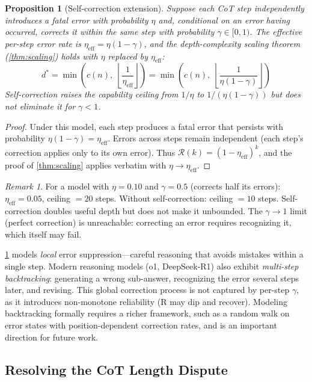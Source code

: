 \documentclass{article}
\newtheorem{proposition}[theorem]{Proposition}
\theoremstyle{definition}
\theoremstyle{remark}
\newtheorem{remark}[theorem]{Remark}
\newcommand{\depth}{d^*}       %
\newcommand{\noise}{\eta}      %
\newcommand{\neff}{\noise_{\mathrm{eff}}} %
\newcommand{\rel}{\mathcal{R}} %
\newcommand{\ccot}{c}          %
\begin{document}
\begin{proposition}[Self-correction extension]
\label{prop:self-correction}
Suppose each CoT step independently introduces a fatal error with probability $\noise$ and, conditional on an error having occurred, corrects it within the same step with probability $\gamma \in [0, 1)$. The effective per-step error rate is $\neff = \noise(1 - \gamma)$, and the depth-complexity scaling theorem (\cref{thm:scaling}) holds with $\noise$ replaced by $\neff$:
\[
\depth = \min\!\left(\ccot(n),\; \left\lfloor \frac{1}{\neff} \right\rfloor\right) = \min\!\left(\ccot(n),\; \left\lfloor \frac{1}{\noise(1-\gamma)} \right\rfloor\right)
\]
Self-correction raises the capability ceiling from $1/\noise$ to $1/(\noise(1-\gamma))$ but does not eliminate it for $\gamma < 1$.
\end{proposition}

\begin{proof}
Under this model, each step produces a fatal error that persists with probability $\noise(1-\gamma) = \neff$. Errors across steps remain independent (each step's correction applies only to its own error). Thus $\rel(k) = (1-\neff)^k$, and the proof of \cref{thm:scaling} applies verbatim with $\noise \to \neff$.
\end{proof}

\begin{remark}
For a model with $\noise = 0.10$ and $\gamma = 0.5$ (corrects half its errors): $\neff = 0.05$, ceiling $= 20$ steps. Without self-correction: ceiling $= 10$ steps. Self-correction doubles useful depth but does not make it unbounded. The $\gamma \to 1$ limit (perfect correction) is unreachable: correcting an error requires recognizing it, which itself may fail.

\cref{prop:self-correction} models \emph{local} error suppression---careful reasoning that avoids mistakes within a single step. Modern reasoning models (o1, DeepSeek-R1) also exhibit \emph{multi-step backtracking}: generating a wrong sub-answer, recognizing the error several steps later, and revising. This global correction process is not captured by per-step $\gamma$, as it introduces non-monotone reliability (R may dip and recover). Modeling backtracking formally requires a richer framework, such as a random walk on error states with position-dependent correction rates, and is an important direction for future work.
\end{remark}

\subsection{Resolving the CoT Length Dispute}
\label{sec:unification}
\end{document}
